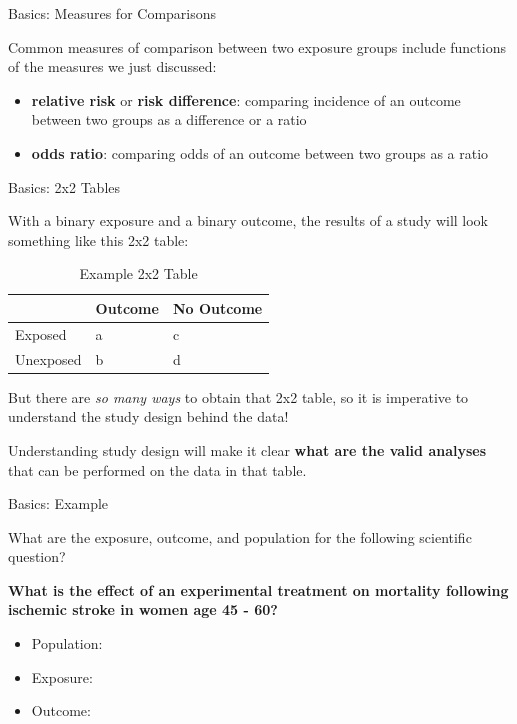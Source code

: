 \documentclass[ignorenonframetext,]{beamer}
\providecommand{\tightlist}{%
  \setlength{\itemsep}{0pt}\setlength{\parskip}{0pt}}
\begin{document}
\begin{frame}{Basics: Measures for Comparisons}
\protect\hypertarget{basics-measures-for-comparisons}{}

Common measures of comparison between two exposure groups include
functions of the measures we just discussed:

\begin{itemize}
\tightlist
\item
  \textbf{relative risk} or \textbf{risk difference}: comparing
  incidence of an outcome between two groups as a difference or a ratio
\item
  \textbf{odds ratio}: comparing odds of an outcome between two groups
  as a ratio
\end{itemize}

\end{frame}

\begin{frame}{Basics: 2x2 Tables}
\protect\hypertarget{basics-2x2-tables}{}

With a binary exposure and a binary outcome, the results of a study will
look something like this 2x2 table:

\begin{table}[!h]

\caption{\label{tab:table3}Example 2x2 Table}
\centering
\begin{tabular}{l|l|l}
\hline
 & Outcome & No Outcome\\
\hline
Exposed & a & c\\
\hline
Unexposed & b & d\\
\hline
\end{tabular}
\end{table}

But there are \emph{so many ways} to obtain that 2x2 table, so it is
imperative to understand the study design behind the data!

Understanding study design will make it clear \textbf{what are the valid
analyses} that can be performed on the data in that table.

\end{frame}

\begin{frame}{Basics: Example}
\protect\hypertarget{basics-example}{}

What are the exposure, outcome, and population for the following
scientific question?

\textbf{What is the effect of an experimental treatment on mortality
following ischemic stroke in women age 45 - 60?}

\begin{itemize}
\tightlist
\item
  Population:
\item
  Exposure:
\item
  Outcome:
\end{itemize}

\end{frame}
\end{document}

